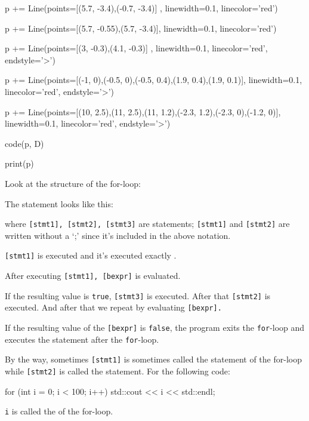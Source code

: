 \begin{python}
p += Line(points=[(5.7, -3.4),(-0.7, -3.4)] , linewidth=0.1, linecolor='red')

p += Line(points=[(5.7, -0.55),(5.7, -3.4)], linewidth=0.1, linecolor='red')

p += Line(points=[(3, -0.3),(4.1, -0.3)] , linewidth=0.1, linecolor='red', endstyle='>')

p += Line(points=[(-1, 0),(-0.5, 0),(-0.5, 0.4),(1.9, 0.4),(1.9, 0.1)], linewidth=0.1, linecolor='red', endstyle='>')

p += Line(points=[(10, 2.5),(11, 2.5),(11, 1.2),(-2.3, 1.2),(-2.3, 0),(-1.2, 0)], linewidth=0.1, linecolor='red', endstyle='>')


code(p, D)

print(p)
\end{python}

Look at the structure of the for-loop:

The statement looks like this:
\begin{center}
\tab[1em]{\EMPHASIZE{\texttt{[stmt3]}}}
\end{center}
where \texttt{[stmt1], [stmt2], [stmt3]} are statements; \texttt{[stmt1]} and \texttt{[stmt2]} are written without a `;' since it's included in the above notation.

\texttt{[stmt1]} is executed  and it's executed exactly .

After executing \texttt{[stmt1], [bexpr]} is evaluated.

If the resulting value is \texttt{true}, \texttt{[stmt3]} is executed.
After that \texttt{[stmt2]} is executed. And after that we repeat by
evaluating \texttt{[bexpr].}

If the resulting value of the \texttt{[bexpr]} is \texttt{false}, the
program exits the \texttt{for}-loop and executes the statement after the
\texttt{for}-loop.

By the way, sometimes \texttt{[stmt1]} is sometimes called the  statement of the for-loop while \texttt{[stmt2]} is called the  statement. For the following code:
\begin{console}
for (int i = 0; i < 100; i++)
{   
    std::cout << i << std::endl;
}
\end{console}
\texttt{i} is called the  of the
for-loop.

